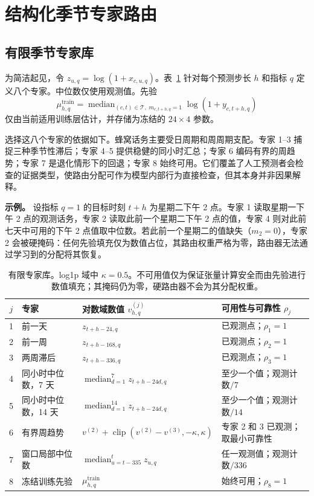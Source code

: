 \documentclass[10pt,conference,letterpaper]{IEEEtran}
\begin{document}
\section{结构化季节专家路由}
\subsection{有限季节专家库}
为简洁起见，令 $z_{u,q}=\log(1+x_{c,u,q})$。表~\ref{tab:experts} 针对每个预测步长 $h$ 和指标 $q$ 定义八个专家。中位数仅使用观测值。先验
\begin{equation}
\mu^{\mathrm{train}}_{h,q}=
\operatorname{median}_{(c,t)\in\mathcal T,\;m_{c,t+h,q}=1}
\log(1+y_{c,t+h,q})
\end{equation}
仅由当前适用训练层估计，并存储为冻结的 $24\times4$ 参数。

选择这八个专家的依据如下。蜂窝话务主要受日周期和周周期支配。专家 1--3 捕捉三种季节性滞后；专家 4--5 提供稳健的同小时汇总；专家 6 编码有界的周趋势；专家 7 是退化情形下的回退；专家 8 始终可用。它们覆盖了人工预测者会检查的证据类型，使路由分配可作为模型内部行为直接检查，但其本身并非因果解释。

\noindent\textbf{示例。} 设指标 $q=1$ 的目标时刻 $t+h$ 为星期二下午 2 点。专家 1 读取星期一下午 2 点的观测话务，专家 2 读取此前一个星期二下午 2 点的值，专家 4 则对此前七天中可用的下午 2 点值取中位数。若此前一个星期二的值缺失（$m_2=0$），专家 2 会被硬掩码：任何先验填充仅为数值占位，其路由权重严格为零，路由器无法通过学习到的分配将其恢复。

\begin{table}[t]
\centering
\caption{有限专家库。log1p 域中 $\kappa=0.5$。不可用值仅为保证张量计算安全而由先验进行数值填充；其掩码仍为零，硬路由器不会为其分配权重。}
\label{tab:experts}
\footnotesize
\setlength{\tabcolsep}{4.0pt}
\begin{tabular}{c>{\raggedright\arraybackslash}p{}>{\raggedright\arraybackslash}p{}>{\raggedright\arraybackslash}p{}}
\toprule
$j$ & 专家 & 对数域数值 $v^{(j)}_{h,q}$ & 可用性与可靠性 $\rho_j$\\
\midrule
1 & 前一天 & $z_{t+h-24,q}$ & 已观测点；$\rho_1=1$\\
2 & 前一周 & $z_{t+h-168,q}$ & 已观测点；$\rho_2=1$\\
3 & 两周滞后 & $z_{t+h-336,q}$ & 已观测点；$\rho_3=1$\\
4 & 同小时中位数，7 天 & $\operatorname{median}_{d=1}^{7}z_{t+h-24d,q}$ & 至少一个值；观测计数$/7$\\
5 & 同小时中位数，14 天 & $\operatorname{median}_{d=1}^{14}z_{t+h-24d,q}$ & 至少一个值；观测计数$/14$\\
6 & 有界周趋势 & $v^{(2)}+\operatorname{clip}(v^{(2)}-v^{(3)},-\kappa,\kappa)$ & 专家 2 和 3 已观测；取最小可靠性\\
7 & 窗口局部中位数 & $\operatorname{median}_{u=t-335}^{t}z_{u,q}$ & 任一观测值；观测计数$/336$\\
8 & 冻结训练先验 & $\mu^{\mathrm{train}}_{h,q}$ & 始终可用；$\rho_8=1$\\
\bottomrule
\end{tabular}
\end{table}
\end{document}
